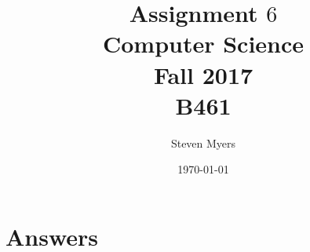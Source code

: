 \documentclass{article}
\begin{document}
\title{Assignment $6$\\ Computer Science \\ Fall 2017\\ B461}         %
\author{Steven Myers}        %
\date{\today}          %
\maketitle

\makeatother     %

\pagestyle{plain}

\section*{Answers}
\end{document}
